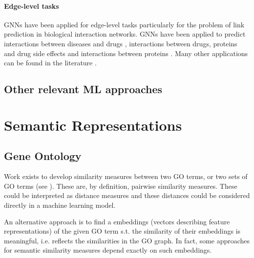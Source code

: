 \documentclass[
	fontsize=10pt, %
	twoside=false, %
	secnumdepth=1, %
]{kaobook}
\begin{document}



\paragraph{Edge-level tasks} GNNs have been applied for edge-level tasks
particularly for the problem of link prediction in biological interaction
networks. GNNs have been applied to predict interactions between diseases and
drugs \cite{bajaj_GraphConvolutionalNetworks_2017}, interactions between drugs,
proteins and drug side effects \cite{zitnik_modeling_2018} and interactions
between proteins \cite{chereda_ExplainingDecisionsGraph_2021}. Many other
applications can be found in the literature
\cite{zhang_GraphNeuralNetworks_2021}.


\subsection{Other relevant ML approaches}



\section{Semantic Representations}

\subsection{Gene Ontology}

\cite{henry_ConvertingDiseaseMaps_2021}
\cite{ostaszewski_ClusteringApproachesVisual_2018}

Work exists to develop similarity measures
between two GO terms, or two sets of GO terms (see ).
These are, by definition, pairwise similarity measures. These
could be interpreted as distance measures and these distances could be
considered directly in a machine learning model.

An alternative approach is to find a embeddings (vectors describing feature
representations) of the given GO term s.t. the similarity of their embeddings is
meaningful, i.e. reflects the similarities in the GO graph. In fact, some
approaches for semantic similarity measures depend exactly on such embeddings.
\end{document}
